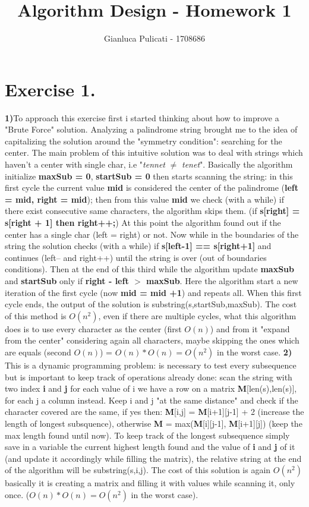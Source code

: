\documentclass[11pt]{scrartcl}
\title{\vspace{-2.0cm}Algorithm Design - Homework 1}
\author{Gianluca Pulicati - 1708686}
\date{\vspace{-5ex}}
\begin{document}
\maketitle

\section*{Exercise 1.}\textbf{1)}To approach this exercise first i started thinking about how to improve a "Brute Force" solution. Analyzing a palindrome string brought me to the idea of capitalizing the solution around the "symmetry condition": searching for the center. The main problem of this intuitive solution was to deal with strings which haven't a center with single char, i.e "\textit{tennet} $\not=$ \textit{tenet}". Basically the algorithm initialize \textbf{maxSub = 0}, \textbf{startSub = 0} then starts scanning the string: in this first cycle the current value \textbf{mid} is considered the center of the palindrome (\textbf{left = mid, right = mid}); then from this value \textbf{mid} we check (with a while) if there exist consecutive same characters, the algorithm skips them. (if \textbf{s[right] = s[right + 1] then \textbf{right++};}) At this point the algorithm found out if the center has a single char (left = right) or not. Now while in the boundaries of the string the solution checks (with a while) if \textbf{s[left-1] == s[right+1]} and continues (left-- and right++) until the string is over (out of boundaries conditions). Then at the end of this third while the algorithm update \textbf{maxSub} and \textbf{startSub} only if \textbf{right - left $>$ maxSub}. Here the algorithm start a new iteration of the first cycle (now \textbf{mid = mid +1}) and repeats all. When this first cycle ends, the output of the solution is substring(s,startSub,maxSub).
The cost of this method is $O(n^2)$, even if there are multiple cycles, what this algorithm does is to use every character as the center (first $O(n)$) and from it "expand from the center" considering again all characters, maybe skipping the ones which are equals (second $O(n)$) = $O(n) * O(n) = O(n^2)$ in the worst case.
 \newline
\textbf{2)} This is a dynamic programming problem: is necessary to test every subsequence but is important to keep track of operations already done: scan the string with two index \textbf{i} and \textbf{j} for each value of i we have a row on a matrix \textbf{M}[len(s),len(s)], for each j a column instead. Keep i and j "at the same distance" and check if the character covered are the same, if yes then: \textbf{M}[i,j] = \textbf{M}[i+1][j-1] + 2 (increase the length of longest subsquence), otherwise \textbf{M} = max(\textbf{M}[i][j-1], \textbf{M}[i+1][j]) (keep the max length found until now). To keep track of the longest subsequence simply save in a variable the current highest length found and the value of \textbf{i} and \textbf{j} of it (and update it accordingly while filling the matrix), the relative string at the end of the algorithm will be substring(s,i,j). The cost of this solution is again $O(n^2)$ basically it is creating a matrix and filling it with values while scanning it, only once. ($O(n) * O(n) = O(n^2)$ in the worst case).
\end{document}
